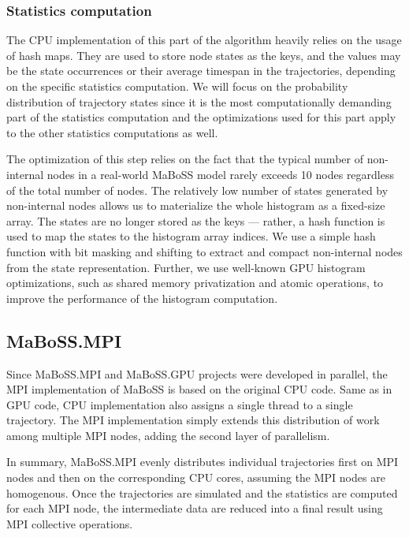 \documentclass[times, twoside]{zHenriquesLab-StyleBioRxiv}
\begin{document}
\subsubsection*{Statistics computation}

The CPU implementation of this part of the algorithm heavily relies on the usage of hash maps. They are used to store node states as the keys, and the values may be the state occurrences or their average timespan in the trajectories, depending on the specific statistics computation. We will focus on the probability distribution of trajectory states since it is the most computationally demanding part of the statistics computation and the optimizations used for this part apply to the other statistics computations as well.

The optimization of this step relies on the fact that the typical number of non-internal nodes in a real-world MaBoSS model rarely exceeds 10 nodes regardless of the total number of nodes. The relatively low number of states generated by non-internal nodes allows us to materialize the whole histogram as a fixed-size array. The states are no longer stored as the keys --- rather, a hash function is used to map the states to the histogram array indices. We use a simple hash function with bit masking and shifting to extract and compact non-internal nodes from the state representation. Further, we use well-known GPU histogram optimizations, such as shared memory privatization and atomic operations, to improve the performance of the histogram computation.

\subsection*{MaBoSS.MPI}
Since MaBoSS.MPI and MaBoSS.GPU projects were developed in parallel, the MPI implementation of MaBoSS is based on the original CPU code. Same as in GPU code, CPU implementation also assigns a single thread to a single trajectory. The MPI implementation simply extends this distribution of work among multiple MPI nodes, adding the second layer of parallelism. 

In summary, MaBoSS.MPI evenly distributes individual trajectories first on MPI nodes and then on the corresponding CPU cores, assuming the MPI nodes are homogenous. Once the trajectories are simulated and the statistics are computed for each MPI node, the intermediate data are reduced into a final result using MPI collective operations.
\end{document}
